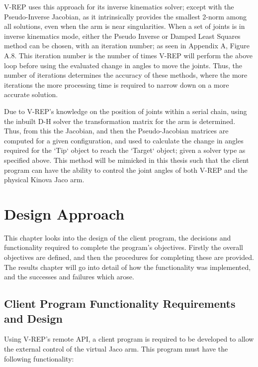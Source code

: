 \documentclass[12pt,openany,a4paper]{book}
\begin{document}
V-REP uses this approach for its inverse kinematics solver; except with the Pseudo-Inverse Jacobian, as it intrinsically provides the smallest 2-norm among all solutions, even when the arm is near singularities. When a set of joints is in inverse kinematics mode, either the Pseudo Inverse or Damped Least Squares method can be chosen, with an iteration number; as seen in Appendix A, Figure A.8. This iteration number is the number of times V-REP will perform the above loop before using the evaluated change in angles to move the joints. Thus, the number of iterations determines the accuracy of these methods, where the more iterations the more processing time is required to narrow down on a more accurate solution.


Due to V-REP's knowledge on the position of joints within a serial chain, using the inbuilt D-H solver the transformation matrix for the arm is determined. Thus, from this the Jacobian, and then the Pseudo-Jacobian matrices are computed for a given configuration, and used to calculate the change in angles required for the `Tip` object to reach the `Target` object; given a solver type as specified above. This method will be mimicked in this thesis such that the client program can have the ability to control the joint angles of both V-REP and the physical Kinova Jaco arm.

\chapter{Design Approach}

This chapter looks into the design of the client program, the decisions and functionality required to complete the program's objectives. Firstly the overall objectives are defined, and then the procedures for completing these are provided. The results chapter will go into detail of how the functionality was implemented, and the successes and failures which arose.

\section{Client Program Functionality Requirements and Design}
Using V-REP's remote API, a client program is required to be developed to allow the external control of the virtual Jaco arm. This program must have the following functionality:
\end{document}
